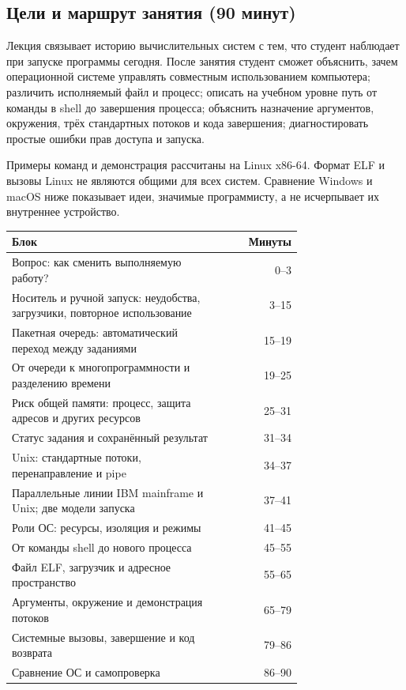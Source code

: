 \label{lecture05}
\subsection*{Цели и маршрут занятия (90 минут)}

Лекция связывает историю вычислительных систем с тем, что студент наблюдает
при запуске программы сегодня. После занятия студент сможет объяснить, зачем
операционной системе управлять совместным использованием компьютера; различить
исполняемый файл и процесс; описать на учебном уровне путь от команды в shell
до завершения процесса; объяснить назначение аргументов, окружения, трёх
стандартных потоков и кода завершения; диагностировать простые ошибки прав
доступа и запуска.

Примеры команд и демонстрация рассчитаны на Linux x86-64. Формат ELF и вызовы
Linux не являются общими для всех систем. Сравнение Windows и macOS ниже
показывает идеи, значимые программисту, а не исчерпывает их внутреннее
устройство.

\begin{center}
\small
\begin{tabular}{|p{0.73\linewidth}|r|}
\hline
Блок & Минуты \\
\hline
Вопрос: как сменить выполняемую работу? & 0--3 \\
Носитель и ручной запуск: неудобства, загрузчики, повторное использование & 3--15 \\
Пакетная очередь: автоматический переход между заданиями & 15--19 \\
От очереди к многопрограммности и разделению времени & 19--25 \\
Риск общей памяти: процесс, защита адресов и других ресурсов & 25--31 \\
Статус задания и сохранённый результат & 31--34 \\
Unix: стандартные потоки, перенаправление и pipe & 34--37 \\
Параллельные линии IBM mainframe и Unix; две модели запуска & 37--41 \\
Роли ОС: ресурсы, изоляция и режимы & 41--45 \\
От команды shell до нового процесса & 45--55 \\
Файл ELF, загрузчик и адресное пространство & 55--65 \\
Аргументы, окружение и демонстрация потоков & 65--79 \\
Системные вызовы, завершение и код возврата & 79--86 \\
Сравнение ОС и самопроверка & 86--90 \\
\hline
\end{tabular}
\end{center}

